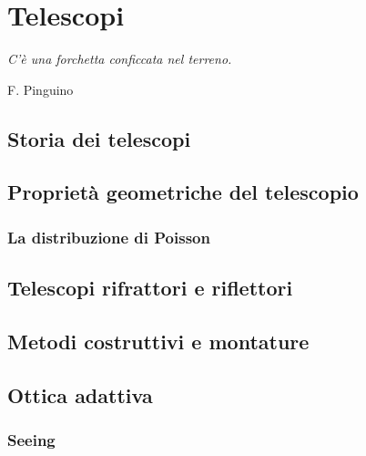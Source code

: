 \chapter{Telescopi}
    \epigraph{\itshape C'è una forchetta conficcata nel terreno.}{F. Pinguino}
    \section{Storia dei telescopi}
    \section{Proprietà geometriche del telescopio}
        \subsection{La distribuzione di Poisson}
    \section{Telescopi rifrattori e riflettori}
    \section{Metodi costruttivi e montature}
    \section{Ottica adattiva}
        \subsection{Seeing}